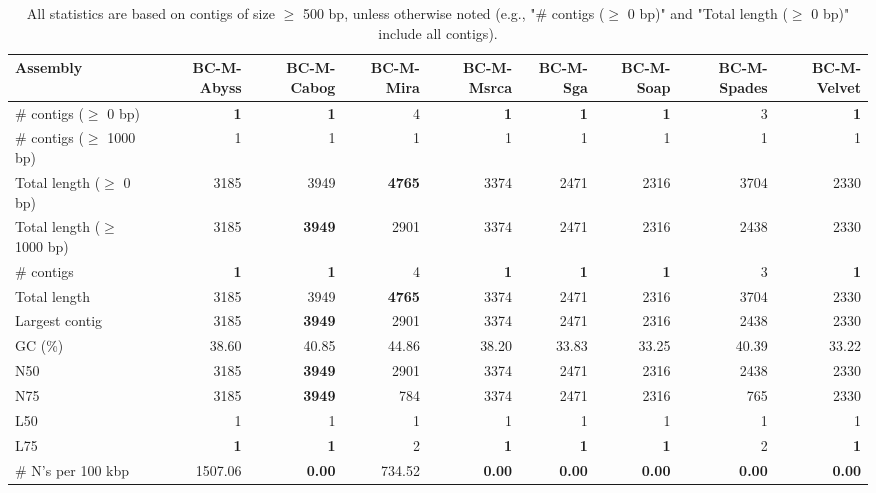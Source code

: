 \documentclass[12pt,a4paper]{article}
\begin{document}
\begin{table}[ht]
\begin{center}
\caption{All statistics are based on contigs of size $\geq$ 500 bp, unless otherwise noted (e.g., "\# contigs ($\geq$ 0 bp)" and "Total length ($\geq$ 0 bp)" include all contigs).}
\begin{tabular}{|l*{8}{|r}|}
\hline
Assembly & BC-M-Abyss & BC-M-Cabog & BC-M-Mira & BC-M-Msrca & BC-M-Sga & BC-M-Soap & BC-M-Spades & BC-M-Velvet \\ \hline
\# contigs ($\geq$ 0 bp) & {\bf 1} & {\bf 1} & 4 & {\bf 1} & {\bf 1} & {\bf 1} & 3 & {\bf 1} \\ \hline
\# contigs ($\geq$ 1000 bp) & 1 & 1 & 1 & 1 & 1 & 1 & 1 & 1 \\ \hline
Total length ($\geq$ 0 bp) & 3185 & 3949 & {\bf 4765} & 3374 & 2471 & 2316 & 3704 & 2330 \\ \hline
Total length ($\geq$ 1000 bp) & 3185 & {\bf 3949} & 2901 & 3374 & 2471 & 2316 & 2438 & 2330 \\ \hline
\# contigs & {\bf 1} & {\bf 1} & 4 & {\bf 1} & {\bf 1} & {\bf 1} & 3 & {\bf 1} \\ \hline
Total length & 3185 & 3949 & {\bf 4765} & 3374 & 2471 & 2316 & 3704 & 2330 \\ \hline
Largest contig & 3185 & {\bf 3949} & 2901 & 3374 & 2471 & 2316 & 2438 & 2330 \\ \hline
GC (\%) & 38.60 & 40.85 & 44.86 & 38.20 & 33.83 & 33.25 & 40.39 & 33.22 \\ \hline
N50 & 3185 & {\bf 3949} & 2901 & 3374 & 2471 & 2316 & 2438 & 2330 \\ \hline
N75 & 3185 & {\bf 3949} & 784 & 3374 & 2471 & 2316 & 765 & 2330 \\ \hline
L50 & 1 & 1 & 1 & 1 & 1 & 1 & 1 & 1 \\ \hline
L75 & {\bf 1} & {\bf 1} & 2 & {\bf 1} & {\bf 1} & {\bf 1} & 2 & {\bf 1} \\ \hline
\# N's per 100 kbp & 1507.06 & {\bf 0.00} & 734.52 & {\bf 0.00} & {\bf 0.00} & {\bf 0.00} & {\bf 0.00} & {\bf 0.00} \\ \hline
\end{tabular}
\end{center}
\end{table}
\end{document}
